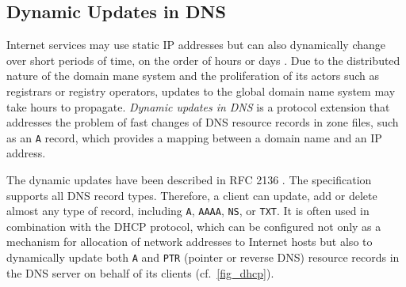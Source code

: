 \subsection{Dynamic Updates in DNS}
Internet services may use static IP addresses but can also dynamically change over short periods of time, on the order of hours or days \cite{gio}.
Due to the distributed nature of the domain mane system and the proliferation of its actors such as registrars or registry operators, updates to the global domain name system may take hours to propagate. 
%
\textit{Dynamic updates in DNS} is a protocol extension that addresses the problem of fast changes of DNS resource records in zone files, such as an \texttt{A} record, which provides a mapping between a domain name and an IP address.

The dynamic updates have been described in RFC 2136 \cite{rfc2136}. 
The specification supports all DNS record types.
Therefore, a client can update, add or delete almost any type of record, including \texttt{A}, \texttt{AAAA}, \texttt{NS}, or \texttt{TXT}.
It is often used %
in combination with the DHCP protocol, which can be configured not only as a mechanism for allocation of network addresses to Internet hosts but also to dynamically update both \texttt{A} and \texttt{PTR} (pointer or reverse DNS) resource records in the DNS server %
on behalf of its clients (cf.~\autoref{fig_dhcp}).




%




